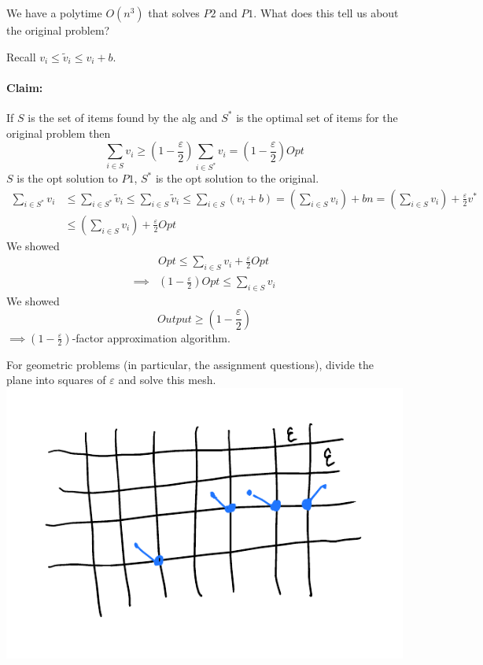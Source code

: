\documentclass[12 pt]{article}
\begin{document}
          We have a polytime $O(n^3)$ that solves $P2$ and $P1$. What
          does this tell us about the original problem?

          Recall $v_i \leq \tilde{v}_i \leq v_i + b$.
          \paragraph{Claim:} If $S$ is the set of items found by the
          alg and $S^*$ is the optimal set of items for the original
          problem then
          $$\sum_{i \in S}v_i \geq \left(1-\frac{\varepsilon}{2}\right)\sum_{i\in S^*}v_i = \left(1-\frac{\varepsilon}{2}\right)Opt$$
          $S$ is the opt solution to $P1$, $S^*$ is the opt solution
          to the original.
          \begin{align*}
            \sum_{i\in S^*} v_i & \leq \sum_{i \in S^*}\tilde{v}_i \leq \sum_{i\in S}\tilde{v}_i \leq \sum_{i \in S}(v_i + b) = \left(\sum_{i \in S}v_i\right)+bn
                                  = \left(\sum_{i\in S}v_i\right)+\frac{\varepsilon}{2}v^*
            \\ & \leq \left(\sum_{i\in S}v_i\right)+\frac{\varepsilon}{2}Opt
          \end{align*}
          We showed
          \begin{align*}
            & Opt \leq \sum_{i\in S}v_i + \frac{\varepsilon}{2}Opt
            \\  \implies & \left(1-\frac{\varepsilon}{2}\right)Opt\leq \sum_{i\in S}v_i
          \end{align*}
          We showed
          $$Output \geq \left(1-\frac{\varepsilon}{2}\right)$$
          $\implies (1-\frac{\varepsilon}{2})$-factor approximation
          algorithm.

          For geometric problems (in particular, the assignment
          questions), divide the plane into squares of $\varepsilon$
          and solve this mesh.
          \\ \includegraphics[width=.9\textwidth]{i160.pdf}
         
\end{document}
